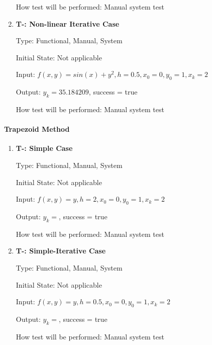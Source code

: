 \documentclass[12pt, titlepage]{article}
\newcounter{tnum} %
\begin{document}
\begin{enumerate}
How test will be performed: Manual system test

\item{\textbf{T-\thetnum \label{t-euler_nonlineariterative}: Non-linear Iterative Case}}

Type: Functional, Manual, System %
					
Initial State: Not applicable
					
Input: $f(x, y) = sin(x) + y^2, h = 0.5, x_0 = 0, y_0 = 1, x_k = 2$
					
Output: $y_k = 35.184209$, success = true
					
How test will be performed: Manual system test

\end{enumerate}

\paragraph{Trapezoid Method}
\begin{enumerate}

\item{\textbf{T-\thetnum \label{t-trap_simple}: Simple Case}}

Type: Functional, Manual, System %
					
Initial State: Not applicable
					
Input: $f(x, y) = y, h = 2, x_0 = 0, y_0 = 1, x_k = 2$
					
Output: $y_k = $, success = true
					
How test will be performed: Manual system test

\item{\textbf{T-\thetnum \label{t-trap_simpleiterative}: Simple-Iterative Case}}

Type: Functional, Manual, System %
					
Initial State: Not applicable
					
Input: $f(x, y) = y, h = 0.5, x_0 = 0, y_0 = 1, x_k = 2$
					
Output: $y_k = $, success = true
					
How test will be performed: Manual system test

\end{enumerate}
\end{document}
